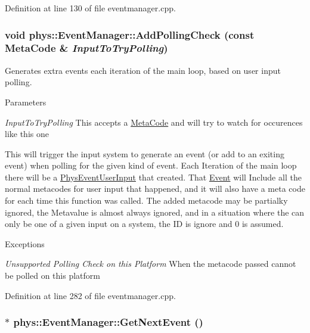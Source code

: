 Definition at line 130 of file eventmanager.cpp.

\hypertarget{classphys_1_1EventManager_a6ff66883358344908afd11204f79f196}{
\subsubsection[{AddPollingCheck}]{\setlength{\rightskip}{0pt plus 5cm}void phys::EventManager::AddPollingCheck (const {\bf MetaCode} \& {\em InputToTryPolling})}}
\label{da/dde/classphys_1_1EventManager_a6ff66883358344908afd11204f79f196}


Generates extra events each iteration of the main loop, based on user input polling. 


\begin{DoxyParams}{Parameters}
\item[{\em InputToTryPolling}]This accepts a \hyperlink{classphys_1_1MetaCode}{MetaCode} and will try to watch for occurences like this one\end{DoxyParams}
This will trigger the input system to generate an event (or add to an exiting event) when polling for the given kind of event. Each Iteration of the main loop there will be a \hyperlink{classPhysEventUserInput}{PhysEventUserInput} that created. That \hyperlink{classphys_1_1Event}{Event} will Include all the normal metacodes for user input that happened, and it will also have a meta code for each time this function was called. The added metacode may be partialky ignored, the Metavalue is almost always ignored, and in a situation where the can only be one of a given input on a system, the ID is ignore and 0 is assumed. 
\begin{DoxyExceptions}{Exceptions}
\item[{\em Unsupported Polling Check on this Platform}]When the metacode passed cannot be polled on this platform \end{DoxyExceptions}


Definition at line 282 of file eventmanager.cpp.

\hypertarget{classphys_1_1EventManager_a4c11830094d6566fd5db87dfbe6b5dd0}{
\subsubsection[{GetNextEvent}]{ $\ast$ phys::EventManager::GetNextEvent ()}}
\label{da/dde/classphys_1_1EventManager_a4c11830094d6566fd5db87dfbe6b5dd0}


